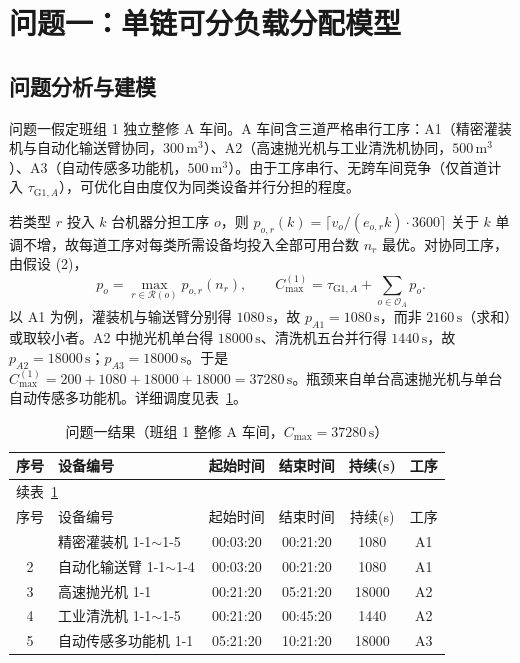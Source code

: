\documentclass[12pt,a4paper]{ctexart}
\begin{document}
\section{问题一：单链可分负载分配模型}

\subsection{问题分析与建模}
问题一假定班组 1 独立整修 A 车间。A 车间含三道严格串行工序：A1（精密灌装机与自动化输送臂协同，$300\,\mathrm{m}^3$）、A2（高速抛光机与工业清洗机协同，$500\,\mathrm{m}^3$）、A3（自动传感多功能机，$500\,\mathrm{m}^3$）。由于工序串行、无跨车间竞争（仅首道计入 $\tau_{\mathrm{G1},A}$），可优化自由度仅为同类设备并行分担的程度。

若类型 $r$ 投入 $k$ 台机器分担工序 $o$，则
$p_{o,r}(k)=\lceil v_o/(e_{o,r}k)\cdot 3600\rceil$ 关于 $k$ 单调不增，故每道工序对每类所需设备均投入全部可用台数 $n_r$ 最优。对协同工序，由假设 (2)，
\begin{equation}
p_o=\max_{r\in\mathcal{R}(o)}p_{o,r}(n_r),\qquad
C_{\max}^{(1)}=\tau_{\mathrm{G1},A}+\sum_{o\in\mathcal{O}_A}p_o.
\end{equation}
以 A1 为例，灌装机与输送臂分别得 $1080\,\mathrm{s}$，故 $p_{A1}=1080\,\mathrm{s}$，而非 $2160\,\mathrm{s}$（求和）或取较小者。A2 中抛光机单台得 $18000\,\mathrm{s}$、清洗机五台并行得 $1440\,\mathrm{s}$，故 $p_{A2}=18000\,\mathrm{s}$；$p_{A3}=18000\,\mathrm{s}$。于是 $C_{\max}^{(1)}=200+1080+18000+18000=37280\,\mathrm{s}$。瓶颈来自单台高速抛光机与单台自动传感多功能机。详细调度见表~\ref{tab:q1}。

\begin{longtable}{c p{4.6cm} c c c c}
\caption{问题一结果（班组 1 整修 A 车间，$C_{\max}=37280\,\mathrm{s}$）}\label{tab:q1}\\
\toprule
序号 & 设备编号 & 起始时间 & 结束时间 & 持续(s) & 工序 \\
\midrule
\endfirsthead
\multicolumn{6}{l}{\small 续表~\ref{tab:q1}}\\
\toprule
序号 & 设备编号 & 起始时间 & 结束时间 & 持续(s) & 工序 \\
\midrule
\endhead
\bottomrule
\endfoot
1 & 精密灌装机 1-1$\sim$1-5 & 00:03:20 & 00:21:20 & 1080 & A1 \\
2 & 自动化输送臂 1-1$\sim$1-4 & 00:03:20 & 00:21:20 & 1080 & A1 \\
3 & 高速抛光机 1-1 & 00:21:20 & 05:21:20 & 18000 & A2 \\
4 & 工业清洗机 1-1$\sim$1-5 & 00:21:20 & 00:45:20 & 1440 & A2 \\
5 & 自动传感多功能机 1-1 & 05:21:20 & 10:21:20 & 18000 & A3 \\
\end{longtable}
\end{document}
